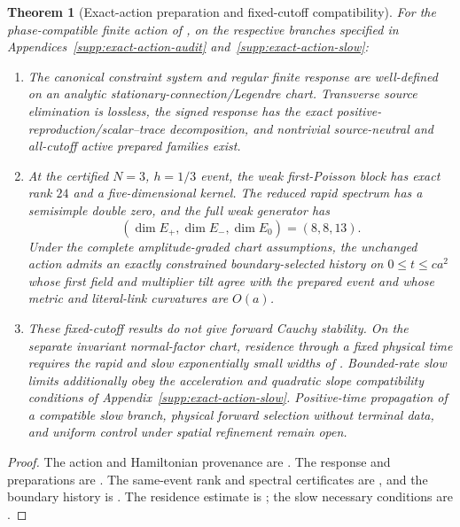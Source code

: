 \documentclass[11pt]{article}
\newtheorem{theorem}{Theorem}[section]
\numberwithin{equation}{section}
\theoremstyle{definition}
\theoremstyle{remark}
\begin{document}
\begin{theorem}[Exact-action preparation and fixed-cutoff compatibility]
\label{thm:main-exact-action-response}
\label{thm:main-exact-action-summary}
For the phase-compatible finite action of
, on the respective branches specified
in Appendices~\ref{supp:exact-action-audit} and~\ref{supp:exact-action-slow}:
\begin{enumerate}[label=\textup{(X\arabic*)},leftmargin=3em]
\item The canonical constraint system and regular finite response are
well-defined on an analytic stationary-connection/Legendre chart.  Transverse
source elimination is lossless, the signed response has the exact
positive-reproduction/scalar--trace decomposition, and nontrivial
source-neutral and all-cutoff active prepared families exist.
\item At the certified $N=3$, $h=1/3$ event, the weak first-Poisson block has
exact rank $24$ and a five-dimensional kernel.  The reduced rapid spectrum has
a semisimple double zero, and the full weak generator has
\begin{equation}
 (\dim E_+,\dim E_-,\dim E_0)=(8,8,13).
 \label{eq:main-exact-8813}
\end{equation}
Under the complete amplitude-graded chart assumptions, the unchanged action
admits an exactly constrained boundary-selected history on
$0\le t\le ca^2$ whose first field and multiplier tilt agree with the prepared
event and whose metric and literal-link curvatures are $O(a)$.
\item These fixed-cutoff results do not give forward Cauchy stability.
On the separate invariant normal-factor chart, residence through a fixed
physical time requires the rapid and slow exponentially small widths of
.  Bounded-rate slow limits additionally obey
the acceleration and quadratic slope compatibility conditions of
Appendix~\ref{supp:exact-action-slow}.  Positive-time propagation of a
compatible slow branch, physical forward selection without terminal data, and
uniform control under spatial refinement remain open.
\end{enumerate}
\end{theorem}
\begin{proof}
The action and Hamiltonian provenance are
.  The response and preparations are
.
The same-event rank and spectral certificates are
, and the
boundary history is .  The residence estimate is
; the slow necessary conditions are
.
\end{proof}
\end{document}
